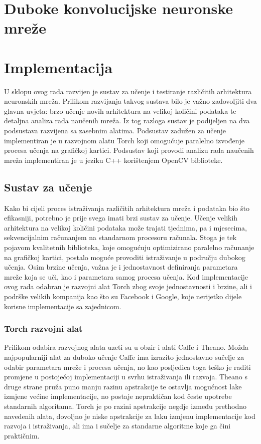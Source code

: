 \documentclass[lmodern, utf8, diplomski, numeric]{fer}
\begin{document}
\chapter{Duboke konvolucijske neuronske mreže}

\chapter{Implementacija}

U sklopu ovog rada razvijen je sustav za učenje i testiranje različitih arhitektura neuronskih mreža. Prilikom razvijanja takvog sustava bilo je važno zadovoljiti dva glavna uvjeta: brzo učenje novih arhitektura na velikoj količini podataka te detaljna analiza rada naučenih mreža. Iz tog razloga sustav je podijeljen na dva podsustava razvijena sa zasebnim alatima. Podsustav zadužen za učenje implementiran je u razvojnom alatu Torch koji omogućuje paralelno izvođenje procesa učenja na grafičkoj kartici. Podsustav koji provodi analizu rada naučenih mreža implementiran je u jeziku C++ korištenjem OpenCV biblioteke.

\section{Sustav za učenje}

Kako bi cijeli proces istraživanja različitih arhitektura mreža i podataka bio što efikasniji, potrebno je prije svega imati brzi sustav za učenje. Učenje velikih arhitektura na velikoj količini podataka može trajati tjednima, pa i mjesecima, sekvencijalnim računanjem na standarnom procesoru računala. Stoga je tek pojavom kvalitetnih biblioteka, koje omogućuju optimizirano paralelno računanje na grafičkoj kartici, postalo moguće provoditi istraživanje u području dubokog učenja. 
Osim brzine učenja, važna je i jednostavnost definiranja parametara mreže koja se uči, kao i parametara samog procesa učenja. Kod implementacije ovog rada odabran je razvojni alat Torch zbog svoje jednostavnosti i brzine, ali i podrške velikih kompanija kao što su Facebook i Google, koje nerijetko dijele korisne implementacije sa zajednicom. 

\subsection{Torch razvojni alat}

Prilikom odabira razvojnog alata uzeti su u obzir i alati Caffe i Theano. Možda najpopularniji alat za duboko učenje Caffe ima izrazito jednostavno sučelje za odabir parametara mreže i procesa učenja, no kao posljedica toga teško je raditi promjene u postojećoj implementaciji u svrhu istraživanja ili razvoja. Theano s druge strane pruža puno manju razinu apstrakcije te ostavlja mogućnost lake izmjene većine implementacije, no postaje nepraktičan kod česte upotrebe standarnih algoritama.
Torch je po razini apstrakcije negdje između prethodno navedenih alata, dovoljno je niske apstrakcije za laku izmjenu implementacije kod razvoja i istraživanja, ali ima i sučelje za standarne algoritme koje ga čini praktičnim. 
\end{document}
